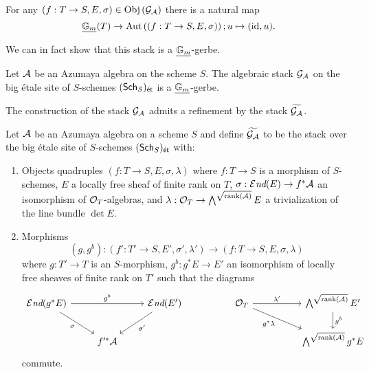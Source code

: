 \begin{remark}
    For any $(f:T\to S, E, \sigma)\in\mathrm{Obj}\left(\mathcal{G}_{\mathcal{A}}\right)$ there is a natural map 
    $$\underline{\mathbb{G}_{m}}(T)\to\mathrm{Aut}\left((f:T\to S, E,\sigma)\right); u\mapsto(\mathrm{id},u).$$
\end{remark}
We can in fact show that this stack is a $\underline{\mathbb{G}_{m}}$-gerbe. 
\begin{proposition}\label{def: stack of Azumaya algebras is a Gm gerbe}
    Let $\mathcal{A}$ be an Azumaya algebra on the scheme $S$. The algebraic stack $\mathcal{G}_{\mathcal{A}}$ on the big \'{e}tale site of $S$-schemes $(\mathsf{Sch}_{S})_{\mathsf{\acute{e}t}}$ is a $\underline{\mathbb{G}_{m}}$-gerbe. 
\end{proposition}
The construction of the stack $\mathcal{G}_{\mathcal{A}}$ admits a refinement by the stack $\widetilde{\mathcal{G}_{\mathcal{A}}}$. 
\newpage
\begin{definition}
    Let $\mathcal{A}$ be an Azumaya algebra on a scheme $S$ and define $\widetilde{\mathcal{G}_{\mathcal{A}}}$ to be the stack over the big \'{e}tale site of $S$-schemes $(\mathsf{Sch}_{S})_{\mathsf{\acute{e}t}}$ with:
    \begin{enumerate}[label=(\alph*)]
        \item Objects quadruples $(f:T\to S, E, \sigma, \lambda)$ where $f:T\to S$ is a morphism of $S$-schemes, $E$ a locally free sheaf of finite rank on $T$, $\sigma:\operatorname{\mathcal{E}\emph{nd}}(E)\to f^{*}\mathcal{A}$ an isomorphism of $\mathcal{O}_{T}$-algebras, and $\lambda:\mathcal{O}_{T}\to\bigwedge^{\sqrt{\mathrm{rank}(\mathcal{A})}}E$ a trivialization of the line bundle $\det E$. 
        \item Morphisms 
        $$(g,g^{b}):(f':T'\to S, E', \sigma', \lambda')\longrightarrow(f:T\to S, E, \sigma, \lambda)$$
        where $g:T'\to T$ is an $S$-morphism, $g^{b}:g^{*}E\to E'$ an isomorphism of locally free sheaves of finite rank on $T'$ such that the diagrams
        $$%
        \begin{tikzcd}
            {\sheafEnd(g^{*}E)} && {\sheafEnd(E')} && {\Ocal_{T}} && {\bigwedge^{\sqrt{\mathrm{rank}(\Acal)}}E'} \\
            & {f'^{*}\Acal} &&&&& {\bigwedge^{\sqrt{\mathrm{rank}(\Acal)}}g^{*}E}
            \arrow["\sigma"', from=1-1, to=2-2]
            \arrow["{\sigma'}", from=1-3, to=2-2]
            \arrow["{g^{b}}", from=1-1, to=1-3]
            \arrow["{\lambda'}", from=1-5, to=1-7]
            \arrow["{g^{*}\lambda}"', from=1-5, to=2-7]
            \arrow["{g^{b}}", from=1-7, to=2-7]
        \end{tikzcd}$$
        commute.
    \end{enumerate}
\end{definition}
